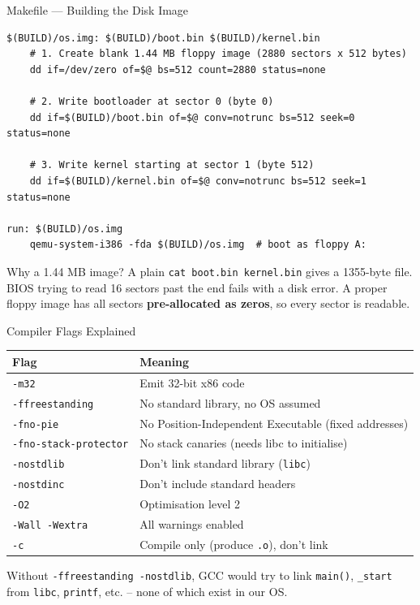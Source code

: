 \documentclass[aspectratio=169]{beamer}
\newcommand{\concept}[2]{%
  \begin{block}{#1}\smallskip #2\smallskip\end{block}\vspace{5pt}}
\begin{document}
\begin{frame}[fragile]{Makefile --- Building the Disk Image}
  \begin{lstlisting}[style=makefile]
$(BUILD)/os.img: $(BUILD)/boot.bin $(BUILD)/kernel.bin
    # 1. Create blank 1.44 MB floppy image (2880 sectors x 512 bytes)
    dd if=/dev/zero of=$@ bs=512 count=2880 status=none

    # 2. Write bootloader at sector 0 (byte 0)
    dd if=$(BUILD)/boot.bin of=$@ conv=notrunc bs=512 seek=0 status=none

    # 3. Write kernel starting at sector 1 (byte 512)
    dd if=$(BUILD)/kernel.bin of=$@ conv=notrunc bs=512 seek=1 status=none

run: $(BUILD)/os.img
    qemu-system-i386 -fda $(BUILD)/os.img  # boot as floppy A:
  \end{lstlisting}
  \vspace{4pt}
  \concept{Why a 1.44 MB image?}{
    A plain \texttt{cat boot.bin kernel.bin} gives a 1355-byte file. BIOS trying to read 16 sectors past the end fails with a disk error. A proper floppy image has all sectors \textbf{pre-allocated as zeros}, so every sector is readable.
  }
\end{frame}

\begin{frame}{Compiler Flags Explained}
  \begin{tabular}{ll}
    \toprule
    \textbf{Flag} & \textbf{Meaning}\\
    \midrule
    \texttt{-m32}                & Emit 32-bit x86 code\\
    \texttt{-ffreestanding}      & No standard library, no OS assumed\\
    \texttt{-fno-pie}            & No Position-Independent Executable (fixed addresses)\\
    \texttt{-fno-stack-protector}& No stack canaries (needs libc to initialise)\\
    \texttt{-nostdlib}           & Don't link standard library (\texttt{libc})\\
    \texttt{-nostdinc}           & Don't include standard headers\\
    \texttt{-O2}                 & Optimisation level 2\\
    \texttt{-Wall -Wextra}       & All warnings enabled\\
    \texttt{-c}                  & Compile only (produce \texttt{.o}), don't link\\
    \bottomrule
  \end{tabular}
  \vspace{6pt}
  Without \texttt{-ffreestanding -nostdlib}, GCC would try to link \texttt{main()}, \texttt{\_start} from \texttt{libc}, \texttt{printf}, etc. -- none of which exist in our OS.
\end{frame}
\end{document}
